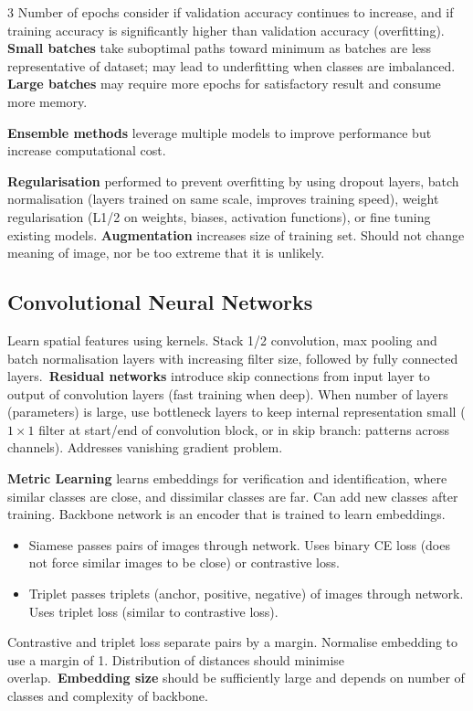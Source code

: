 \documentclass{article}
\begin{document}
\begin{multicols}{3}
    Number of epochs consider if validation accuracy continues to
    increase, and if training accuracy is significantly higher than
    validation accuracy (overfitting). \textbf{Small batches} take
    suboptimal paths toward minimum as batches are less representative
    of dataset; may lead to underfitting when classes are imbalanced.
    \textbf{Large batches} may require more epochs for satisfactory
    result and consume more memory.

    \textbf{Ensemble methods} leverage multiple models to improve performance
    but increase computational cost.

    \textbf{Regularisation} performed to prevent overfitting by using dropout
    layers, batch normalisation (layers trained on same scale, improves
    training speed), weight regularisation (L1/2 on weights, biases,
    activation functions), or fine tuning existing models.
    \textbf{Augmentation} increases size of training set. Should not change
    meaning of image, nor be too extreme that it is unlikely.
    \subsection{Convolutional Neural Networks}
    Learn spatial features using kernels. Stack 1/2 convolution, max
    pooling and batch normalisation layers with increasing filter size,
    followed by fully connected layers.\ \textbf{Residual
    networks} introduce skip connections from input layer to output of
    convolution layers (fast training when deep). When number of layers
    (parameters) is large, use bottleneck layers to keep internal
    representation small (\(1 \times 1\) filter at start/end of
    convolution block, or in skip branch: patterns across channels).
    Addresses vanishing gradient problem.

    \textbf{Metric Learning} learns embeddings
    for verification and identification, where
    similar classes are close, and dissimilar classes are far. Can add
    new classes after training. Backbone network is an encoder that is
    trained to learn embeddings.
    \begin{itemize}
        \item Siamese passes pairs of images through network. Uses
              binary CE loss (does not force similar images to be
              close) or contrastive loss.
        \item Triplet passes triplets (anchor, positive, negative) of
              images through network. Uses triplet loss (similar to
              contrastive loss).
    \end{itemize}
    Contrastive and triplet loss separate pairs by a margin.
    Normalise embedding to use a margin of 1.
    Distribution of distances should minimise overlap.\
    \textbf{Embedding size} should be sufficiently
    large and depends on number of classes and complexity of backbone.

\end{multicols}
\end{document}
